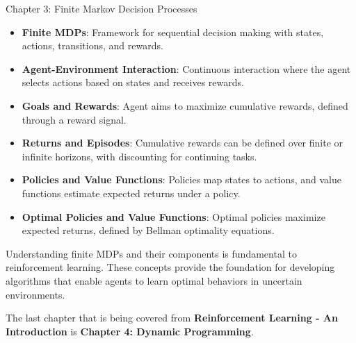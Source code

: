 \begin{notes}{Chapter 3: Finite Markov Decision Processes}
\begin{highlight}
        \begin{itemize}
            \item \textbf{Finite MDPs}: Framework for sequential decision making with states, actions, transitions, and rewards.
            \item \textbf{Agent-Environment Interaction}: Continuous interaction where the agent selects actions based on states and receives rewards.
            \item \textbf{Goals and Rewards}: Agent aims to maximize cumulative rewards, defined through a reward signal.
            \item \textbf{Returns and Episodes}: Cumulative rewards can be defined over finite or infinite horizons, with discounting for continuing tasks.
            \item \textbf{Policies and Value Functions}: Policies map states to actions, and value functions estimate expected returns under a policy.
            \item \textbf{Optimal Policies and Value Functions}: Optimal policies maximize expected returns, defined by Bellman optimality equations.
        \end{itemize}
    
    Understanding finite MDPs and their components is fundamental to reinforcement learning. These concepts provide the foundation for developing algorithms that enable agents to learn optimal behaviors 
    in uncertain environments.
    
    \end{highlight}
\end{notes}

The last chapter that is being covered from \textbf{Reinforcement Learning - An Introduction} is \textbf{Chapter 4: Dynamic Programming}.

